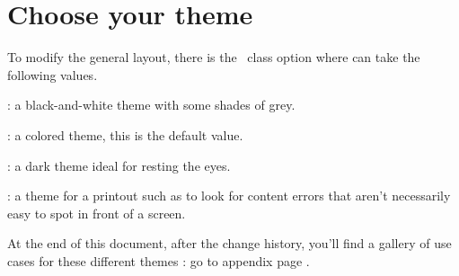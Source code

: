 \documentclass{tutodoc}
\begin{document}
\section{Choose your theme}

To modify the general layout, there is the \thisproj\ class option  where  can take the following values.

\begin{tasks}[style=itemize]
    \task {}:
          a black-and-white theme with some shades of grey.

    \task {}:
          a colored theme, this is the default value.

    \task {}:
          a dark theme ideal for resting the eyes.

    \task {}:
          a theme for a printout such as to look for content errors that aren't necessarily easy to spot in front of a screen.
\end{tasks}


\begin{tdocnote}
    At the end of this document, after the change history, you'll find a gallery of use cases for these different themes : go to appendix page \pageref{tutodoc-theme-gallery}.
\end{tdocnote}
\end{document}
